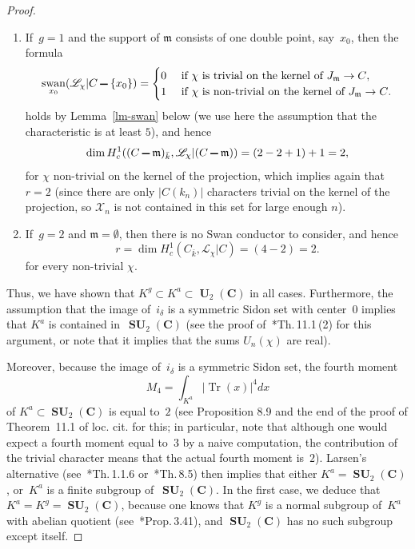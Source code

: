 \documentclass[12pt]{amsart}
\numberwithin{equation}{section}
\def\setminus{\mathchoice
    {\mathbin{\vrule height .62ex width 1.61ex depth -.38ex}}%
    {\mathbin{\vrule height .62ex width 1.61ex depth -.38ex}}%
    {\mathbin{\vrule height .50ex width 0.85ex depth -.28ex}}%
    {\mathbin{\vrule height .20ex width 0.570ex depth -.24ex}}%
}
\newcommand{\Cc}{\mathbf{C}}
\def\loccit{loc.\kern3pt cit.{}\xspace}
\newcommand{\mfm}{\mathfrak{m}}
\DeclareMathOperator{\Tr}{Tr}
\DeclareMathOperator{\swan}{swan}
\DeclareMathOperator{\SU}{\mathbf{SU}}
\DeclareMathOperator{\Un}{\mathbf{U}}
\theoremstyle{plain}
\theoremstyle{remark}
\theoremstyle{definition}
\newcommand{\mcL}{\mathscr{L}}
\newcommand{\mcX}{\mathscr{X}}
\begin{document}
\begin{proof}
\begin{enumerate}
  \item If~$g=1$ and the support of $\mfm$ consists of one double point,
    say~$x_0$, then the formula
    \[
      \swan_{x_0}(\mcL_{\chi}|C\setminus\{x_0\} )=
      \begin{cases} 0&\text{ if $\chi$ is trivial on the kernel of
          $J_{\mfm}\to C$},
        \\
        1&\text{ if $\chi$ is non-trivial on the kernel of
          $J_{\mfm}\to C$}.
      \end{cases}
    \]
    holds by Lemma~\ref{lm-swan} below (we use here the assumption that
    the characteristic is at least $5$), and hence
    \[
      \dim H^1_c((C\setminus
      \mfm)_{\bar{k}},\mcL_{\chi}|(C\setminus\mfm))=(2-2+1)+1=2,
    \]
    for $\chi$ non-trivial on the kernel of the projection, which
    implies again that $r=2$ (since there are only $|C(k_n)|$ characters
    trivial on the kernel of the projection, so $\mcX_n$ is not
    contained in this set for large enough $n$).
    
  \item If~$g=2$ and $\mfm=\emptyset$, then there is no Swan conductor to
    consider, and hence
    \[
      r=\dim H^1_c(C_{\bar{k}},\mcL_{\chi}|C)=(4-2)=2.
    \]
    for every non-trivial $\chi$. 
  \end{enumerate}

  Thus, we have shown that $K^g\subset K^a\subset \Un_2(\Cc)$ in all
  cases. Furthermore, the assumption that the image of~$i_{\delta}$ is a
  symmetric Sidon set with center~$0$ implies that $K^a$ is contained
  in~$\SU_2(\Cc)$ (see the proof of~\cite{ffk}*{Th.\,11.1\,(2)} for this
  argument, or note that it implies that the sums $U_n(\chi)$ are real).

  Moreover, because the image of~$i_{\delta}$ is a symmetric Sidon set,
  the fourth moment
  \[
    M_4=\int_{K^a}\lvert\Tr(x)\rvert^4dx
  \]
  of $K^a\subset\SU_2(\Cc)$ is equal to~$2$ (see Proposition 8.9 and
  the end of the proof of Theorem~11.1 of \loccit for this; in
  particular, note that although one would expect a fourth moment
  equal to~$3$ by a naive computation, the contribution of the trivial
  character means that the actual fourth moment is~$2$). Larsen's alternative (see~\cite{katz-larsen}*{Th.\,1.1.6}
  or~\cite{ffk}*{Th.\,8.5}) then implies that either \hbox{$K^a=\SU_2(\Cc)$},
  or~$K^a$ is a finite subgroup of~$\SU_2(\Cc)$. In the first case,
  we deduce that $K^a=K^g=\SU_2(\Cc)$, because one knows that
  $K^g$ is a normal subgroup of~$K^a$ with abelian quotient
  (see~\cite{ffk}*{Prop.\,3.41}), and $\SU_2(\Cc)$ has no such subgroup
  except itself.


\end{proof}
\end{document}
